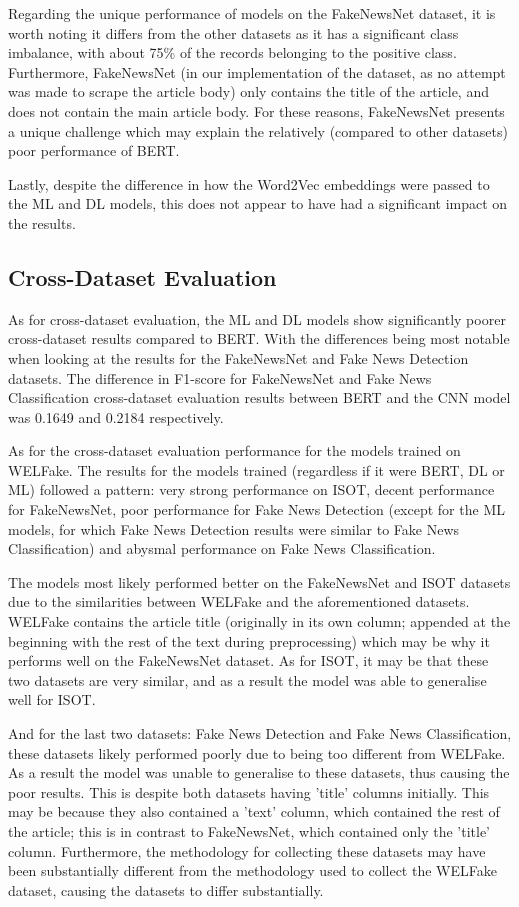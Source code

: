 \documentclass[stu,12pt,floatsintext,donotrepeattitle]{apa7}
\begin{document}
Regarding the unique performance of models on the FakeNewsNet dataset, it is worth noting it differs from the other datasets as it has a significant class imbalance, with about 75\% of the records belonging to the positive class. Furthermore, FakeNewsNet (in our implementation of the dataset, as no attempt was made to scrape the article body) only contains the title of the article, and does not contain the main article body. For these reasons, FakeNewsNet presents a unique challenge which may explain the relatively (compared to other datasets) poor performance of BERT. 

Lastly, despite the difference in how the Word2Vec embeddings were passed to the ML and DL models, this does not appear to have had a significant impact on the results. 

\subsection{Cross-Dataset Evaluation}
As for cross-dataset evaluation, the ML and DL models show significantly poorer cross-dataset results compared to BERT. With the differences being most notable when looking at the results for the FakeNewsNet and Fake News Detection datasets. The difference in F1-score for FakeNewsNet and Fake News Classification cross-dataset evaluation results between BERT and the CNN model was 0.1649 and 0.2184 respectively.

As for the cross-dataset evaluation performance for the models trained on WELFake. The results for the models trained (regardless if it were BERT, DL or ML) followed a pattern: very strong performance on ISOT, decent performance for FakeNewsNet, poor performance for Fake News Detection (except for the ML models, for which Fake News Detection results were similar to Fake News Classification) and abysmal performance on Fake News Classification. 

The models most likely performed better on the FakeNewsNet and ISOT datasets due to the similarities between WELFake and the aforementioned datasets. WELFake contains the article title (originally in its own column; appended at the beginning with the rest of the text during preprocessing) which may be why it performs well on the FakeNewsNet dataset. As for ISOT, it may be that these two datasets are very similar, and as a result the model was able to generalise well for ISOT. 

And for the last two datasets: Fake News Detection and Fake News Classification, these datasets likely performed poorly due to being too different from WELFake. As a result the model was unable to generalise to these datasets, thus causing the poor results. This is despite both datasets having 'title' columns initially. This may be because they also contained a 'text' column, which contained the rest of the article; this is in contrast to FakeNewsNet, which contained only the 'title' column. Furthermore, the methodology for collecting these datasets may have been substantially different from the methodology used to collect the WELFake dataset, causing the datasets to differ substantially.
\end{document}
